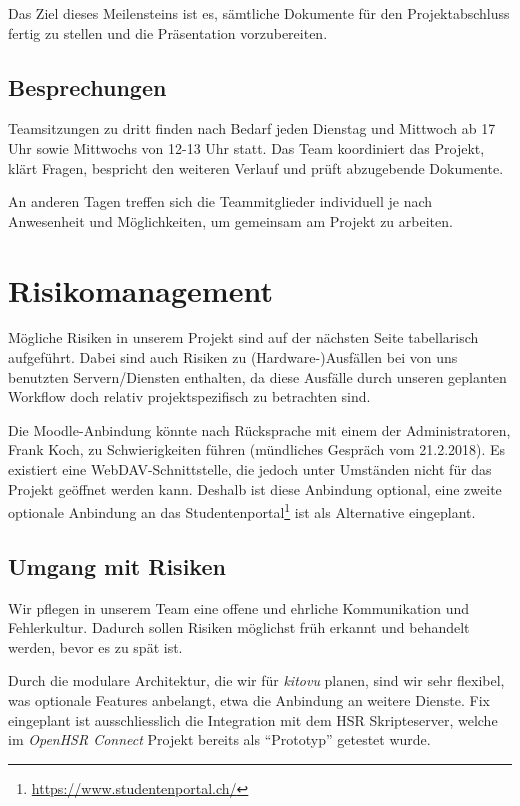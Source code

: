 \documentclass[a4paper]{article}
\let\oldsection\section
\renewcommand\section{\clearpage\oldsection}
\begin{document}
Das Ziel dieses Meilensteins ist es, sämtliche Dokumente für den Projektabschluss fertig zu stellen und die Präsentation vorzubereiten.

\subsection{Besprechungen}
Teamsitzungen zu dritt finden nach Bedarf jeden Dienstag und Mittwoch ab 17 Uhr sowie Mittwochs von 12-13 Uhr statt. Das Team koordiniert das Projekt, klärt Fragen, bespricht den weiteren Verlauf und prüft abzugebende Dokumente.

An anderen Tagen treffen sich die Teammitglieder individuell je nach Anwesenheit und Möglichkeiten, um gemeinsam am Projekt zu arbeiten.


\section{Risikomanagement}
Mögliche Risiken in unserem Projekt sind auf der nächsten Seite tabellarisch
aufgeführt. Dabei sind auch Risiken zu (Hardware-)Ausfällen bei von uns
benutzten Servern/Diensten enthalten, da diese Ausfälle durch unseren geplanten
Workflow doch relativ projektspezifisch zu betrachten sind.

Die Moodle-Anbindung könnte nach Rücksprache mit einem der Administratoren,
Frank Koch, zu Schwierigkeiten führen (mündliches Gespräch vom 21.2.2018). Es existiert eine WebDAV-Schnittstelle, die jedoch unter Umständen nicht für das Projekt geöffnet werden kann. Deshalb ist diese Anbindung optional, eine zweite optionale Anbindung an das
Studentenportal\footnote{\url{https://www.studentenportal.ch/}} ist als  Alternative eingeplant.

\subsection{Umgang mit Risiken}

Wir pflegen in unserem Team eine offene und ehrliche Kommunikation und
Fehlerkultur. Dadurch sollen Risiken möglichst früh erkannt und behandelt
werden, bevor es zu spät ist.

Durch die modulare Architektur, die wir für \emph{kitovu} planen, sind wir sehr flexibel, was optionale Features anbelangt, etwa die Anbindung an weitere Dienste. Fix eingeplant ist ausschliesslich die Integration mit dem HSR Skripteserver, welche im \emph{OpenHSR Connect} Projekt bereits als ``Prototyp'' getestet wurde.
\end{document}
